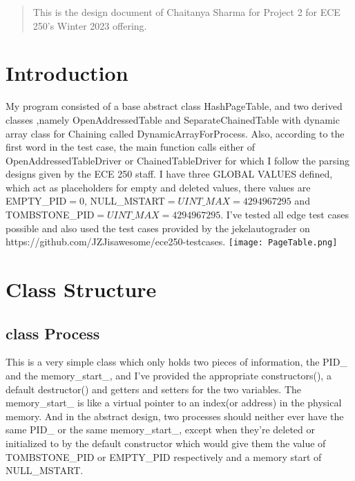 \begin{center}
	\begin{abstract}
		This is the design document of Chaitanya Sharma for Project 2 for ECE 250's Winter 2023 offering.
	\end{abstract}
\end{center}

\section{Introduction}
My program consisted of a base abstract class {\color{draculapurple}HashPageTable}, and two derived classes ,namely {\color{draculapurple}OpenAddressedTable} and
	{\color{draculapurple}SeparateChainedTable} with dynamic array class for Chaining called {\color{draculapurple}DynamicArrayForProcess}.
Also, according to the first word in the test case, the {\color{draculapurple}main} function calls
either of {\color{draculapurple}OpenAddressedTableDriver} or {\color{draculapurple}ChainedTableDriver} for which I follow the
parsing designs given by the ECE 250 staff.
I have three {\color{Awesome}GLOBAL VALUES} defined,
which act as placeholders for empty and deleted values, there values are {\color{LimeGreen}EMPTY\_PID}$=0$,
{\color{LimeGreen}NULL\_MSTART}$=UINT\_MAX=4294967295$ and {\color{LimeGreen}TOMBSTONE\_PID}$=UINT\_MAX=4294967295$.
\newline I've tested all edge test cases possible and also used the test cases provided by the
jekelautograder on {\color{DarkPastelBlue}https://github.com/JZJisawesome/ece250-testcases}.
\newline
\texttt{[image: PageTable.png]}
\section{Class Structure}
\subsection{{\color{orange}class} {\color{draculapurple}Process}}
    This is a very simple class which only holds two pieces of information, the {\color{Turquoise}PID\_} and the
	{\color{Turquoise}memory\_start\_}, and I've provided the appropriate {\color{draculapurple}constructors()}, a
	{\color{draculapurple}default destructor()} and getters and setters for the two variables. The {\color{Turquoise}memory\_start\_} is
    like a virtual pointer to an index(or address) in the physical memory. And in the abstract design,
    two processes should neither ever have the same {\color{Turquoise}PID\_} or the same {\color{Turquoise}memory\_start\_},
    except when they're deleted or initialized to by the default constructor which would give them the value of
	{\color{LimeGreen}TOMBSTONE\_PID} or {\color{LimeGreen}EMPTY\_PID} respectively and a memory start of
	{\color{LimeGreen}NULL\_MSTART}.


